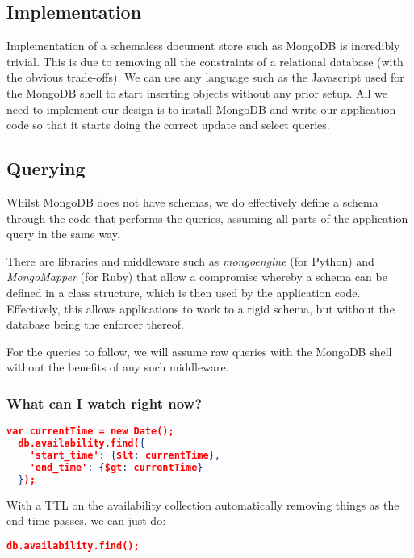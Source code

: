 \documentclass[11pt,a4paper]{article}
\begin{document}
\subsection{Implementation}
\label{sec:mongo-implementation}

Implementation of a schemaless document store such as MongoDB is
incredibly trivial. This is due to removing all the constraints
of a relational database (with the obvious trade-offs). We can use
any language such as the Javascript used for the MongoDB shell to
start inserting objects without any prior setup. All we need to implement
our design is to install MongoDB and write our application code so that
it starts doing the correct update and select queries.

\subsection{Querying}
\label{sec:mongo-querying}

Whilst MongoDB does not have schemas, we do effectively define
a schema through the code that performs the queries, assuming
all parts of the application query in the same way.

There are libraries and middleware such as \emph{mongoengine} (for
Python) and \emph{MongoMapper} (for Ruby) that allow a compromise
whereby a schema can be defined in a class structure, which is
then used by the application code.  Effectively,
this allows applications to work to a rigid schema, but without the
database being the enforcer thereof.

For the queries to follow, we will assume raw queries with the MongoDB
shell without the benefits of any such middleware.

\subsubsection{What can I watch right now?}

\begin{lstlisting}[language=json]
  var currentTime = new Date();
  db.availability.find({
    'start_time': {$lt: currentTime},
    'end_time': {$gt: currentTime}
  });
\end{lstlisting}

With a TTL on the availability collection automatically removing things
as the end time passes, we can just do:

\begin{lstlisting}[language=json]
  db.availability.find();
\end{lstlisting}
\end{document}
